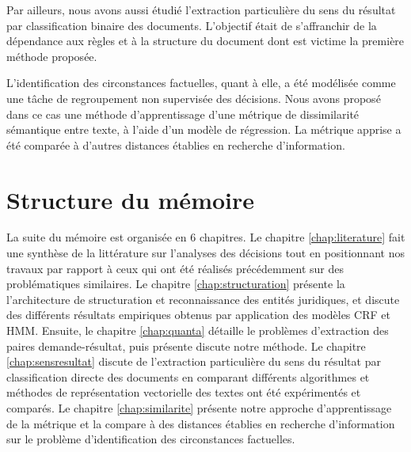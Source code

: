 Par ailleurs, nous avons aussi étudié l'extraction particulière du sens du résultat par classification binaire des documents. L'objectif était de s'affranchir de la dépendance aux règles et à la structure du document dont est victime la première méthode proposée. 

L'identification des circonstances factuelles, quant à elle, a été  modélisée comme une tâche de regroupement non supervisée des décisions. Nous avons proposé dans ce cas une méthode d'apprentissage d'une métrique de dissimilarité sémantique entre texte, à l'aide d'un modèle de régression. La métrique apprise a été comparée à d'autres distances établies en recherche d'information.

\section{Structure du mémoire}
\label{sec:intro:organisation}

La suite du mémoire est organisée en 6 chapitres. Le chapitre \ref{chap:literature} fait une synthèse de la littérature sur l'analyses des décisions tout en positionnant nos travaux par rapport à ceux qui ont été réalisés précédemment sur des problématiques similaires. Le chapitre \ref{chap:structuration} présente la l'architecture de structuration et reconnaissance des entités juridiques, et discute des différents résultats empiriques obtenus par application des modèles CRF et HMM. Ensuite, le chapitre \ref{chap:quanta} détaille le problèmes  d'extraction des paires demande-résultat, puis présente discute notre méthode. Le chapitre \ref{chap:sensresultat} discute de l'extraction particulière du sens du résultat par classification directe des documents en comparant différents algorithmes et méthodes de représentation vectorielle des textes ont été expérimentés et comparés. Le chapitre \ref{chap:similarite} présente notre approche d'apprentissage de la métrique et la compare à des distances établies en recherche d'information sur le problème d'identification des circonstances factuelles.
